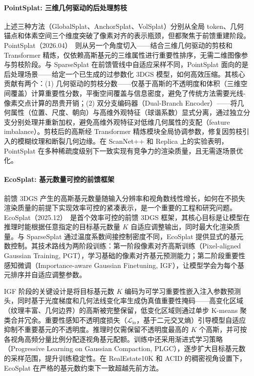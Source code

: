 \paragraph{PointSplat: 三维几何驱动的后处理剪枝}

上述三种方法（GlobalSplat、AnchorSplat、VolSplat）分别从全局 token、几何锚点和体素空间三个维度突破了像素对齐的表示瓶颈，但都聚焦于前馈重建阶段。PointSplat（2026.04）~\cite{2604_09903}则从另一个角度切入——结合三维几何驱动的剪枝和 Transformer 精炼，仅依赖高斯基元的三维属性进行重要性排序，无需二维图像参与剪枝阶段。与 SparseSplat 在前馈管线中自适应采样不同，PointSplat 面向的是后处理场景——给定一个已生成的过参数化 3DGS 模型，如何高效压缩。其核心贡献有两个：(1) 几何驱动的剪枝分数——仅基于高斯的不透明度和体积（三维空间覆盖）计算重要性分数，平衡空间覆盖与信息密度，避免了传统方法需要光线-像素交点计算的昂贵开销；(2) 双分支编码器（Dual-Branch Encoder）——将几何属性（位置、尺度、朝向）与高维外观特征（球谐系数）显式分离，通过独立分支分别处理并重新加权，避免高维外观特征对低维几何属性的支配（feature imbalance）。剪枝后的高斯经 Transformer 精炼模块全局协调参数，修复因剪枝引入的模糊纹理和断裂几何边缘。在 ScanNet++ 和 Replica 上的实验表明，PointSplat 在多种稀疏度级别下一致实现有竞争力的渲染质量，且无需逐场景优化。

\paragraph{EcoSplat: 基元数量可控的前馈框架}

前馈 3DGS 产生的高斯基元数量随输入分辨率和视角数线性增长，如何在不损失渲染质量的前提下实现效率可控的紧凑表示，是一个重要的工程和研究问题。EcoSplat（2025.12）~\cite{2512_18692}是首个效率可控的前馈 3DGS 框架，其核心目标是让模型在推理时能根据任意指定的目标基元数量 $K$ 自适应调整输出，同时最大化渲染质量。与 SparseSplat 通过温度系数间接控制密度不同，EcoSplat 提供显式的基元数控制。其技术路线为两阶段训练：第一阶段像素对齐高斯训练（Pixel-aligned Gaussian Training, PGT），学习基础的像素对齐基元预测能力；第二阶段重要性感知微调（Importance-aware Gaussian Finetuning, IGF），让模型学会为每个基元排序并自适应调整参数。

IGF 阶段的关键设计是将目标基元数 $K$ 编码为可学习重要性嵌入注入参数预测头，同时基于光度梯度和几何法线变化率生成伪真值重要性掩码——高变化区域（纹理丰富、几何边界）的高斯被完整保留，低变化区域则通过单步 K-means 聚类合并冗余。重要性感知不透明度损失（$\mathcal{L}_{\text{io}}$，基于二元交叉熵）引导模型自适应抑制不重要基元的不透明度。推理时仅需保留不透明度最高的 $K$ 个高斯，并可按各视角高频分量比例分配逐视角基元配额。训练中还采用渐进式学习策略（Progressive Learning on Gaussian Compaction, PLGC），逐步扩大目标基元数的采样范围，提升训练稳定性。在 RealEstate10K 和 ACID 的稠密视角设置下，EcoSplat 在严格的基元数约束下一致超越先前方法。

